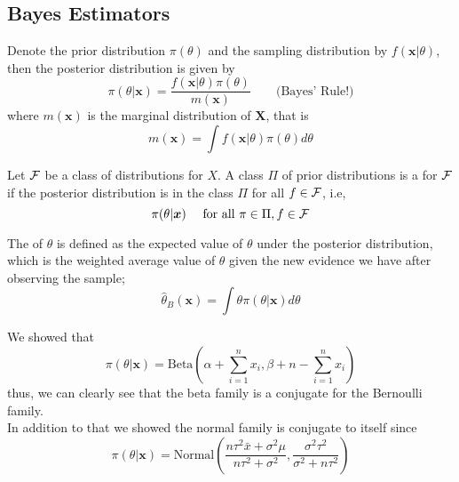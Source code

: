 \subsection{Bayes Estimators}
Denote the prior distribution $\pi(\theta)$ and the sampling distribution by $f(\boldsymbol{x}|\theta)$, then the posterior distribution is given by 
$$
\pi(\theta|\boldsymbol{x}) = \frac{f(\boldsymbol{x}|\theta)\pi(\theta)}{m(\boldsymbol{x})} \quad 
\quad \text{(Bayes' Rule!)}
$$
where $m(\boldsymbol{x})$ is the marginal distribution of $\boldsymbol{X}$, that is 
$$
    m(\boldsymbol{x}) = \int f(\boldsymbol{x}|\theta)\pi(\theta)d\theta
$$

\begin{definition}
    Let $\mathcal F$ be a class of distributions for $X$. A class $\Pi$ of prior distributions is a  for $\mathcal F$ if the posterior distribution is in the class $\Pi$ for all $f \in \mathcal F$, i.e,
    $$
    \pi(\theta|\boldsymbol{x})\quad \text{ for all } \pi \in \Pi, f \in \mathcal F
    $$
\end{definition}

The  of $\theta$ is defined as the expected value of $\theta$ under the posterior distribution, which is the weighted average value of $\theta$ given the new evidence we have after observing the sample;
$$
\hat{\theta}_{B}(\boldsymbol{x}) = \int \theta \pi (\theta|\boldsymbol{x})d\theta 
$$
\begin{example}
We showed that 
$$
    \pi(\theta|\boldsymbol{x}) = \text{Beta}
    \left(\alpha + \sum_{i=1}^{n}x_i, \beta + n - \sum_{i=1}^{n}x_i \right)
$$
thus, we can clearly see that the beta family is a conjugate for the Bernoulli family.
\\
In addition to that we showed the normal family is conjugate to itself since
$$
\pi(\theta|\boldsymbol{x}) = \text{Normal}
\left( 
\frac{n \tau^2 \bar{x} + \sigma^2 \mu}{n \tau^2 + \sigma^2},
\frac{\sigma^2 \tau^2}{\sigma^2 + n \tau^2}
\right )
$$
\end{example}